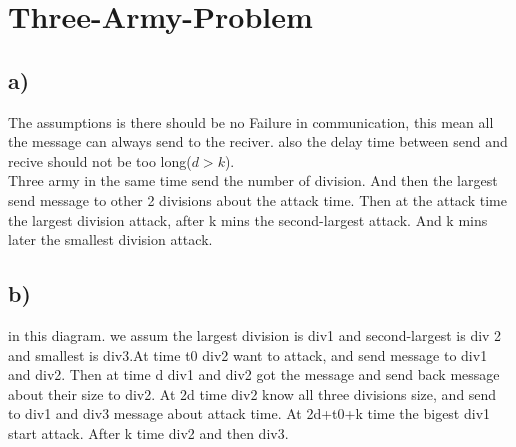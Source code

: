 \documentclass{article}
\begin{document}
\section*{Three-Army-Problem}
\subsection*{a)}
The assumptions is there should be no Failure in communication, this mean all the message can always send to the reciver. also the delay time between send and recive should not be too long($d>k$).\\
Three army in the same time send the number of division. And then the largest send message to other 2 divisions about the attack time. Then at the attack time the largest division attack, after k mins the second-largest attack. And k mins later the smallest division attack.
\subsection*{b)}
in this diagram. we assum the largest division is div1 and second-largest is div 2 and smallest is div3.At time t0 div2 want to attack, and send message to div1 and div2. Then at time d div1 and div2 got the message and send back message about their size to div2. At 2d time div2 know all three divisions size, and send to div1 and div3 message about attack time. At 2d+t0+k time the bigest div1 start attack. After k time div2 and then div3. 
\end{document}
